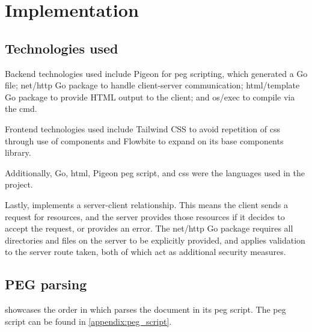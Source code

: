 \section{Implementation}\label{impl}
\subsection{\nmu Technologies \nmu used}\label{impl:tech_used}
Backend technologies used include Pigeon \parencite{pigeon} for \acrfull{peg} scripting, which generated a Go file; net/http Go package \parencite{net-http} to handle client-server communication; html/template Go package \parencite{html-template} to provide HTML output to the client; and os/exec \parencite{os-exec} to compile \latexspaced via the \acrfull{cmd}.

Frontend technologies used include Tailwind CSS \parencite{tailwind} to avoid repetition of \acrfull{css} through use of components and Flowbite \parencite{flowbite} to expand on its base components library.

Additionally, Go, \acrfull{html}, Pigeon \parencite{pigeon} \acrshort{peg} script, and \acrshort{css} were the languages used in the project.

Lastly, \lintexspaced implements a server-client relationship. This means the client sends a request for resources, and the server provides those resources if it decides to accept the request, or provides an error. The net/http Go package \parencite{net-http} requires all directories and files on the server to be explicitly provided, and applies validation to the server route taken, both of which act as additional security measures.

\subsection{PEG parsing}\label{impl:peg_parsing}
 showcases the order in which \lintexspaced parses the document in its \acrshort{peg} script. The \acrshort{peg} script can be found in \cref{appendix:peg_script}.

